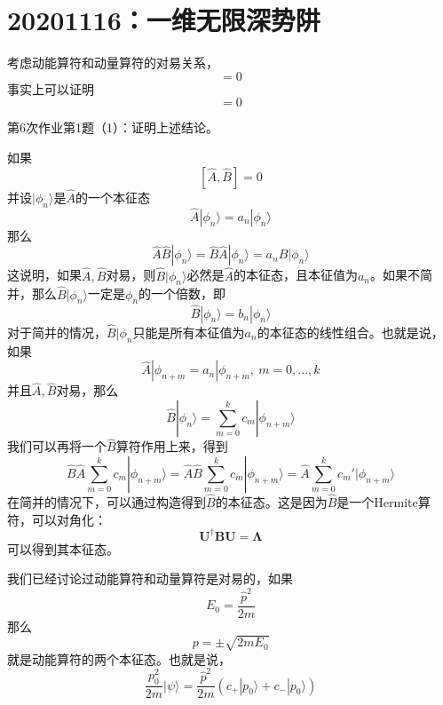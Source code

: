     \section{20201116：一维无限深势阱}
        考虑动能算符和动量算符的对易关系，
        \begin{equation}
            [\frac {\hat{p}^2}{2m}, \hat{p}] = 0
        \end{equation}
        事实上可以证明
        \begin{equation}
            [f(\hat{A}),g(\hat{A})] = 0
        \end{equation}
        \begin{asg}
            第6次作业第1题（1）：证明上述结论。
        \end{asg}
        如果
        \[ [\hat{A},\hat{B}]=0 \]
        并设$|\phi_n\rangle$是$\hat{A}$的一个本征态
        \[ \hat{A} |\phi_n \rangle = a_n |\phi_n \rangle \]
        那么
        \[ \hat{A} \hat{B} |\phi_n \rangle = \hat{B}\hat{A} |\phi_n \rangle = a_n \hat{B} |\phi_n \rangle \]
        这说明，如果$\hat{A},\hat{B}$对易，则$\hat{B}|\phi_n\rangle$必然是$\hat{A}$的本征态，且本征值为$a_n$。如果不简并，那么$\hat{B}|\phi_n\rangle$一定是$\phi_n$的一个倍数，即
        \begin{equation}
            \hat{B}|\phi_n \rangle = b_n |\phi_n \rangle
        \end{equation}
        对于简并的情况，$\hat{B}|\phi_n$只能是所有本征值为$a_n$的本征态的线性组合。也就是说，如果
        \[ \hat{A}|\phi_{n+m} = a_n |\phi_{n+m},\ m=0,...,k\]
        并且$\hat{A},\hat{B}$对易，那么
        \[ \hat{B}|\phi_n \rangle = \sum_{m=0}^k c_m |\phi_{n+m} \rangle \]
        我们可以再将一个$\hat{B}$算符作用上来，得到
        \[ \hat{B}\hat{A} \sum_{m=0}^k c_m|\phi_{n+m}\rangle = \hat{A} \hat{B} \sum_{m=0}^k c_m|\phi_{n+m} \rangle = \hat{A} \sum_{m=0}^k c_m'|\phi_{n+m} \rangle \]
        在简并的情况下，可以通过构造得到$\hat{B}$的本征态。这是因为$\hat{B}$是一个Hermite算符，可以对角化：
        \[ \bm{U}^\dagger \bm{BU} = \bm{\Lambda} \]
        可以得到其本征态。

        我们已经讨论过动能算符和动量算符是对易的，如果
        \[ E_0 = \frac {\hat{p}^2}{2m} \]
        那么
        \[ p = \pm \sqrt{2mE_0} \]
        就是动能算符的两个本征态。也就是说，
        \[ \frac {p_0^2}{2m} |\psi\rangle = \frac {\hat{p}^2}{2m} (c_+|p_0\rangle + c_-|p_0\rangle) \]

